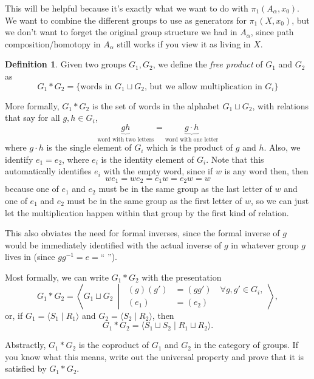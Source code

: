 \documentclass{article}
\theoremstyle{definition}
\newtheorem{defi}[thm]{Definition}
\theoremstyle{remark}
\numberwithin{figure}{section}
\begin{document}
This will be helpful because it's exactly what we want to do with $\pi_1(A_\alpha, x_0)$. We want to combine the different groups to use as generators for $\pi_1(X, x_0)$, but we don't want to forget the original group structure we had in $A_\alpha$, since path composition/homotopy in $A_\alpha$ still works if you view it as living in $X$.

\begin{defi}
	Given two groups $G_1, G_2$, we define the \emph{free product} of $G_1$ and $G_2$ as
	\[
	G_1 * G_2 = \{\text{words in } G_1 \sqcup G_2 \text{, but we allow multiplication in } G_i\}
	\]
\end{defi}

More formally, $G_1 * G_2$ is the set of words in the alphabet $G_1 \sqcup G_2$, with relations that say for all $g, h \in G_i$,
\[
\underbrace{gh}_{\text{word with two letters}} = \underbrace{g \cdot h}_{\text{word with one letter}}
\]
where $g \cdot h$ is the single element of $G_i$ which is the product of $g$ and $h$. Also, we identify $e_1 = e_2$, where $e_i$ is the identity element of $G_i$. Note that this automatically identifies $e_i$ with the empty word, since if $w$ is any word then, then
\[
we_1 = we_2 = e_1w = e_2w = w
\]
because one of $e_1$ and $e_2$ must be in the same group as the last letter of $w$ and one of $e_1$ and $e_2$ must be in the same group as the first letter of $w$, so we can just let the multiplication happen within that group by the first kind of relation.

This also obviates the need for formal inverses, since the formal inverse of $g$ would be immediately identified with the actual inverse of $g$ in whatever group $g$ lives in (since $gg^{-1} = e = \text{``\ ''}$).

Most formally, we can write $G_1 * G_2$ with the presentation
\[
G_1 * G_2 = \left\langle G_1 \sqcup G_2 \ \middle|\ \begin{aligned}(g)(g') &= (gg')\quad \forall g, g' \in G_i,\\(e_1) &= (e_2)\end{aligned} \right\rangle,
\]
or, if $G_1 = \langle S_1 \mid R_1 \rangle$ and $G_2 = \langle S_2 \mid R_2 \rangle$, then
\[
G_1 * G_2 = \langle S_1 \sqcup S_2 \mid R_1 \sqcup R_2 \rangle.
\]

Abstractly, $G_1 * G_2$ is the coproduct of $G_1$ and $G_2$ in the category of groups. If you know what this means, write out the universal property and prove that it is satisfied by $G_1 * G_2$.
\bigskip
\end{document}
